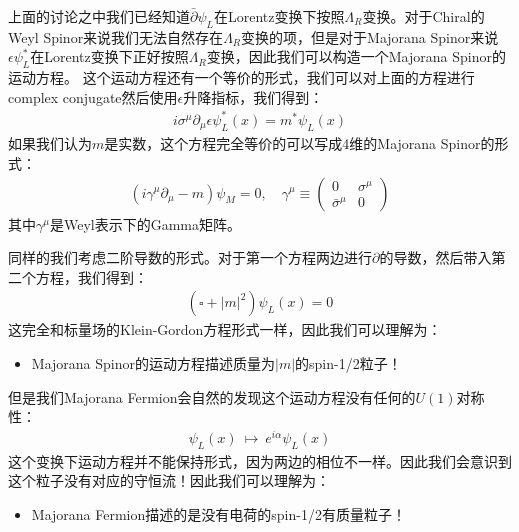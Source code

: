 
上面的讨论之中我们已经知道$ \bar{\partial} \psi_L $在Lorentz变换下按照$ \Lambda_R $变换。对于Chiral的Weyl Spinor来说我们无法自然存在$ \Lambda_R $变换的项，但是对于Majorana Spinor来说$ \epsilon \psi_L^*$在Lorentz变换下正好按照$ \Lambda_R $变换，因此我们可以构造一个Majorana Spinor的运动方程。
这个运动方程还有一个等价的形式，我们可以对上面的方程进行complex conjugate然后使用$ \epsilon $升降指标，我们得到：
\begin{align}
  i\sigma^\mu\partial_\mu\epsilon\psi_L^*(x)=m^*\psi_L(x)
\end{align}
如果我们认为$ m $是实数，这个方程完全等价的可以写成4维的Majorana Spinor的形式：
\begin{align}
  (i\gamma^\mu\partial_\mu-m)\psi_M=0 , \quad \gamma^\mu\equiv\begin{pmatrix}0&\sigma^\mu\\\bar{\sigma}^\mu&0\end{pmatrix}
\end{align}
其中$ \gamma^\mu $是Weyl表示下的Gamma矩阵。

\bigskip
{}

同样的我们考虑二阶导数的形式。对于第一个方程两边进行$ \partial $的导数，然后带入第二个方程，我们得到：
\begin{align}
  (\square+|m|^2)\psi_L(x)=0
\end{align}
这完全和标量场的Klein-Gordon方程形式一样，因此我们可以理解为：
\begin{itemize}
  \item Majorana Spinor的运动方程描述质量为$ |m| $的spin-1/2粒子！
\end{itemize}

\bigskip
{}

但是我们Majorana Fermion会自然的发现这个运动方程没有任何的$ U(1) $对称性：
\begin{align}
  \psi_L(x)\mathrm{~}\mapsto\mathrm{~}e^{i\alpha}\psi_L(x)
\end{align}
这个变换下运动方程并不能保持形式，因为两边的相位不一样。因此我们会意识到这个粒子没有对应的守恒流！因此我们可以理解为：
\begin{itemize}
  \item Majorana Fermion描述的是没有电荷的spin-1/2有质量粒子！
\end{itemize}


